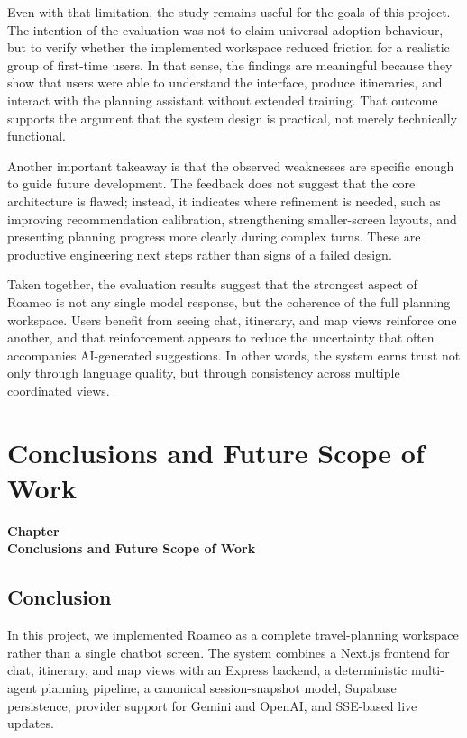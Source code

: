 \documentclass[12pt,a4paper]{report}
\newcommand{\chaptercontentheading}[1]{%
  \thispagestyle{mainstyle}%
  \begin{center}
    {\Large\bfseries Chapter~\thechapter}\\[0.35cm]
    {\Large\bfseries #1}
  \end{center}
  \vspace{0.9cm}
}
\begin{document}
Even with that limitation, the study remains useful for the goals of this project. The intention of the evaluation was not to claim universal adoption behaviour, but to verify whether the implemented workspace reduced friction for a realistic group of first-time users. In that sense, the findings are meaningful because they show that users were able to understand the interface, produce itineraries, and interact with the planning assistant without extended training. That outcome supports the argument that the system design is practical, not merely technically functional.

Another important takeaway is that the observed weaknesses are specific enough to guide future development. The feedback does not suggest that the core architecture is flawed; instead, it indicates where refinement is needed, such as improving recommendation calibration, strengthening smaller-screen layouts, and presenting planning progress more clearly during complex turns. These are productive engineering next steps rather than signs of a failed design.

Taken together, the evaluation results suggest that the strongest aspect of Roameo is not any single model response, but the coherence of the full planning workspace. Users benefit from seeing chat, itinerary, and map views reinforce one another, and that reinforcement appears to reduce the uncertainty that often accompanies AI-generated suggestions. In other words, the system earns trust not only through language quality, but through consistency across multiple coordinated views.



\chapter{Conclusions and Future Scope of Work}
\chaptercontentheading{Conclusions and Future Scope of Work}

\section{Conclusion}

In this project, we implemented Roameo as a complete travel-planning workspace rather than a single chatbot screen. The system combines a Next.js frontend for chat, itinerary, and map views with an Express backend, a deterministic multi-agent planning pipeline, a canonical session-snapshot model, Supabase persistence, provider support for Gemini and OpenAI, and SSE-based live updates.
\end{document}
